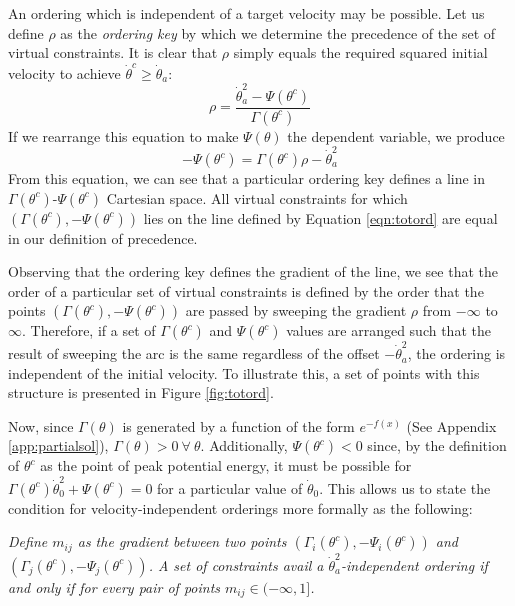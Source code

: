 An ordering which is independent of a target velocity may be possible. Let us define $\rho$ as the \textit{ordering key} by which we determine the precedence of the set of virtual constraints. It is clear that $\rho$ simply equals the required squared initial velocity to achieve $\dot{\theta}^c \geq \dot{\theta}_a$:
\[
	\rho = \frac{\dot{\theta}_a^2 - \Psi(\theta^c)}{\Gamma(\theta^c)}
\]
If we rearrange this equation to make $\Psi(\theta)$ the dependent variable, we produce
\begin{equation} \label{eqn:totord}
	-\Psi(\theta^c) = \Gamma(\theta^c)\rho - \dot{\theta}_a^2
\end{equation}
From this equation, we can see that a particular ordering key defines a line in $\Gamma(\theta^c)$-$\Psi(\theta^c)$ Cartesian space. All virtual constraints for which $(\Gamma(\theta^c), -\Psi(\theta^c))$ lies on the line defined by Equation \ref{eqn:totord} are equal in our definition of precedence.

Observing that the ordering key defines the gradient of the line, we see that the order of a particular set of virtual constraints is defined by the order that the points $(\Gamma(\theta^c), -\Psi(\theta^c))$ are passed by sweeping the gradient $\rho$ from $-\infty$ to $\infty$. Therefore, if a set of $\Gamma(\theta^c)$ and $\Psi(\theta^c)$ values are arranged such that the result of sweeping the arc is the same regardless of the offset $-\dot{\theta}_a^2$, the ordering is independent of the initial velocity. To illustrate this, a set of points with this structure is presented in Figure \ref{fig:totord}. 

Now, since $\Gamma(\theta)$ is generated by a function of the form $e^{-f(x)}$ (See Appendix \ref{app:partialsol}), $\Gamma(\theta)>0 ~ \forall ~ \theta$. Additionally, $\Psi(\theta^c)<0$ since, by the definition of $\theta^c$ as the point of peak potential energy, it must be possible for $\Gamma(\theta^c)\dot{\theta}_0^2 + \Psi(\theta^c) = 0$ for a particular value of $\dot{\theta}_0$. This allows us to state the condition for velocity-independent orderings more formally as the following:

\emph{Define $m_{ij}$ as the gradient between two points $\left(\Gamma_i(\theta^c), -\Psi_i(\theta^c)\right)$ and $\left(\Gamma_j(\theta^c), -\Psi_j(\theta^c)\right)$. A set of constraints avail a $\dot{\theta}_a^2$-independent ordering if and only if for every pair of points $m_{ij}\in(-\infty,1]$.}

